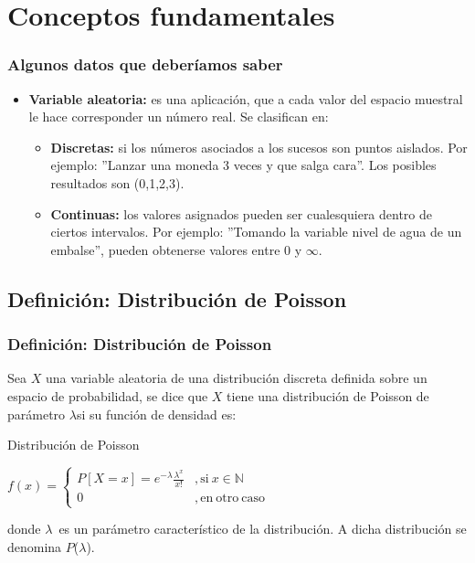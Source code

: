 \documentclass{beamer}
\newcommand{\LAl}{{\lambda}}
\newcommand{\LA}{{$\lambda$}}
\begin{document}
\section{Conceptos fundamentales}
\begin{frame}
\frametitle{Algunos datos que deberíamos saber}

\begin{itemize}
\item \textbf{Variable aleatoria:} es una aplicación, que a cada valor del espacio muestral le hace corresponder un número real. Se clasifican en:
\pause
\begin{itemize}
\item \textbf{Discretas:} si los números asociados a los sucesos son puntos aislados. Por ejemplo: ''Lanzar una moneda 3 veces y que salga cara''. Los posibles resultados son (0,1,2,3).
\item \textbf{Continuas:} los valores asignados pueden ser cualesquiera dentro de ciertos intervalos. Por ejemplo: ''Tomando la variable nivel de agua de un embalse'', pueden obtenerse valores entre $0$ y $\infty$.
\end{itemize}
\end{itemize}

\end {frame}
\subsection{Definición: Distribución de Poisson}
\begin{frame}
\frametitle{Definición: Distribución de Poisson}
Sea $X$ una variable aleatoria de una distribución discreta definida sobre un espacio de probabilidad, se dice que $X$ tiene una distribución de Poisson de parámetro \LA si su función de densidad es:
\begin{block}{Distribución de Poisson}
\centerline{$f(x)=\left\{
	\begin{array}{ll}
        P[X=x]=e^{- \LAl}\frac{\LAl^{x}}{x!} & \mathrm{,si\ } x \in \mathbb{N} \\  
        0 & \mathrm{,en\ otro\ caso\ } 
        \end{array}
\right.$}
\end{block}
donde \LA \ es un parámetro característico de la distribución. A dicha distribución se denomina $P$(\LA).

\end{frame}
\end{document}
